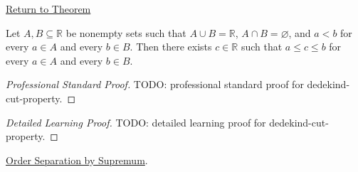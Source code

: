 \newpage
{}
\label{prf:dedekind-cut-property}

\begin{remark*}[Return]
\hyperref[thm:dedekind-cut-property]{Return to Theorem}
\end{remark*}

\begin{theorem*}
Let $A,B\subseteq\mathbb{R}$ be nonempty sets such that
$A\cup B=\mathbb{R}$, $A\cap B=\varnothing$, and $a<b$ for every $a\in A$
and every $b\in B$. Then there exists $c\in\mathbb{R}$ such that
$a\le c\le b$ for every $a\in A$ and every $b\in B$.
\end{theorem*}

\begin{proof}[Professional Standard Proof]
\LRAProofBodyStart
TODO: professional standard proof for dedekind-cut-property.
\end{proof}

\begin{proof}[Detailed Learning Proof]
\LRAProofBodyStart
TODO: detailed learning proof for dedekind-cut-property.
\end{proof}

\begin{remark*}
\end{remark*}

\begin{dependencies}
\hyperref[thm:order-separation-by-supremum]{Order Separation by Supremum}.
\end{dependencies}

\clearpage
